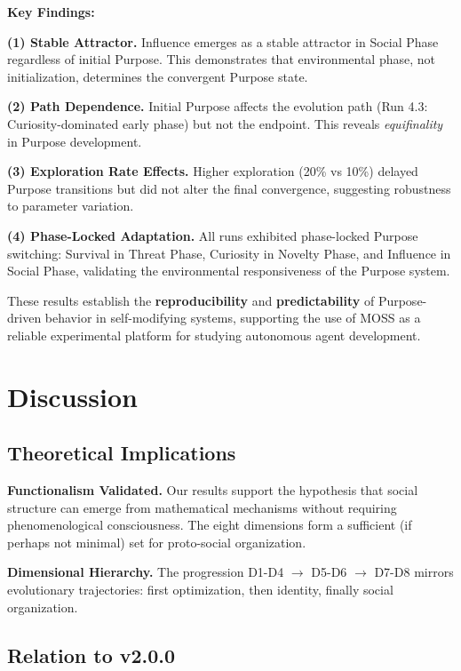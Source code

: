 \documentclass{article}
\begin{document}
\textbf{Key Findings:}

\textbf{(1) Stable Attractor.} Influence emerges as a stable attractor in Social Phase regardless of initial Purpose. This demonstrates that environmental phase, not initialization, determines the convergent Purpose state.

\textbf{(2) Path Dependence.} Initial Purpose affects the evolution path (Run 4.3: Curiosity-dominated early phase) but not the endpoint. This reveals \textit{equifinality} in Purpose development.

\textbf{(3) Exploration Rate Effects.} Higher exploration (20\% vs 10\%) delayed Purpose transitions but did not alter the final convergence, suggesting robustness to parameter variation.

\textbf{(4) Phase-Locked Adaptation.} All runs exhibited phase-locked Purpose switching: Survival in Threat Phase, Curiosity in Novelty Phase, and Influence in Social Phase, validating the environmental responsiveness of the Purpose system.

These results establish the \textbf{reproducibility} and \textbf{predictability} of Purpose-driven behavior in self-modifying systems, supporting the use of MOSS as a reliable experimental platform for studying autonomous agent development.

\section{Discussion}

\subsection{Theoretical Implications}

\textbf{Functionalism Validated.} Our results support the hypothesis that social structure can emerge from mathematical mechanisms without requiring phenomenological consciousness. The eight dimensions form a sufficient (if perhaps not minimal) set for proto-social organization.

\textbf{Dimensional Hierarchy.} The progression D1-D4 $\rightarrow$ D5-D6 $\rightarrow$ D7-D8 mirrors evolutionary trajectories: first optimization, then identity, finally social organization.

\subsection{Relation to v2.0.0}
\end{document}
